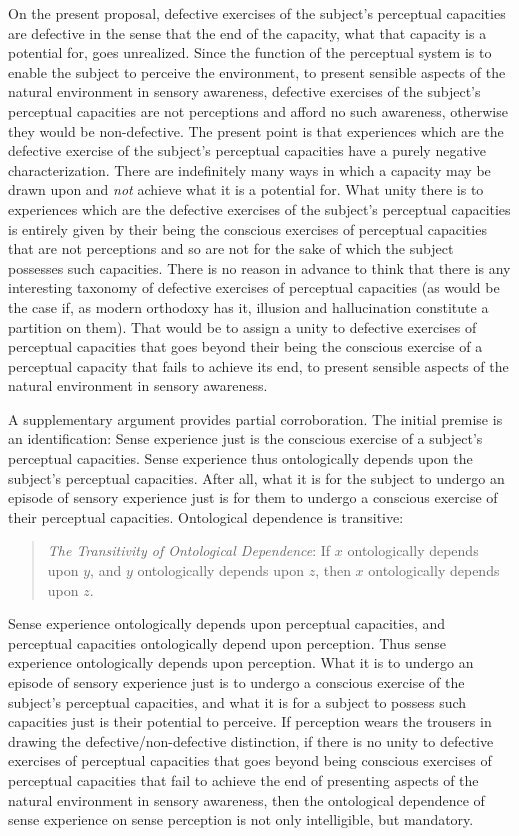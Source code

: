 \documentclass[12pt]{article}
\begin{document}
On the present proposal, defective exercises of the subject's perceptual capacities are defective in the sense that the end of the capacity, what that capacity is a potential for, goes unrealized. Since the function of the perceptual system is to enable the subject to perceive the environment, to present sensible aspects of the natural environment in sensory awareness, defective exercises of the subject's perceptual capacities are not perceptions and afford no such awareness, otherwise they would be non-defective. The present point is that experiences which are the defective exercise of the subject's perceptual capacities have a purely negative characterization. There are indefinitely many ways in which a capacity may be drawn upon and \emph{not} achieve what it is a potential for. What unity there is to experiences which are the defective exercises of the subject's perceptual capacities is entirely given by their being the conscious exercises of perceptual capacities that are not perceptions and so are not for the sake of which the subject possesses such capacities. There is no reason in advance to think that there is any interesting taxonomy of defective exercises of perceptual capacities (as would be the case if, as modern orthodoxy has it, illusion and hallucination constitute a partition on them). That would be to assign a unity to defective exercises of perceptual capacities that goes beyond their being the conscious exercise of a perceptual capacity that fails to achieve its end, to present sensible aspects of the natural environment in sensory awareness. 

A supplementary argument provides partial corroboration. The initial premise is an identification: Sense experience just is the conscious exercise of a subject's perceptual capacities. Sense experience thus ontologically depends upon the subject's perceptual capacities. After all, what it is for the subject to undergo an episode of sensory experience just is for them to undergo a conscious exercise of their perceptual capacities. Ontological dependence is transitive: 
\begin{quote}
	\emph{The Transitivity of Ontological Dependence}: If \( x \) ontologically depends upon \( y \), and \( y \) ontologically depends upon \( z \), then \( x \) ontologically depends upon \( z \). 
\end{quote}
Sense experience ontologically depends upon perceptual capacities, and perceptual capacities ontologically depend upon perception. Thus sense experience ontologically depends upon perception. What it is to undergo an episode of sensory experience just is to undergo a conscious exercise of the subject's perceptual capacities, and what it is for a subject to possess such capacities just is their potential to perceive. If perception wears the trousers in drawing the defective/non-defective distinction, if there is no unity to defective exercises of perceptual capacities that goes beyond being conscious exercises of perceptual capacities that fail to achieve the end of presenting aspects of the natural environment in sensory awareness, then the ontological dependence of sense experience on sense perception is not only intelligible, but mandatory.
\end{document}
